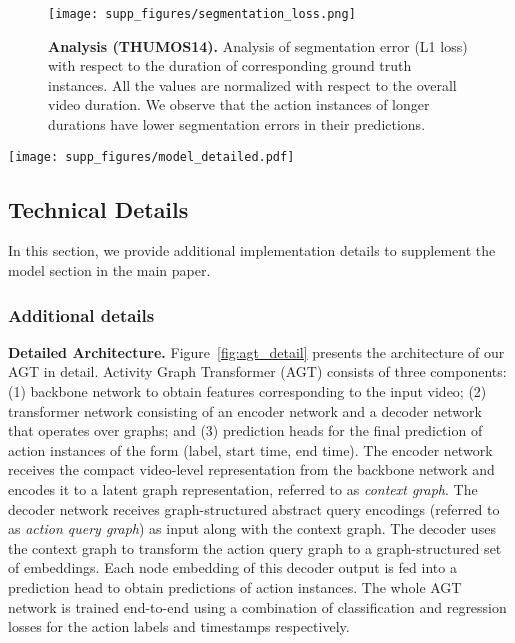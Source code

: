 \documentclass[10pt,twocolumn,letterpaper]{article}
\begin{document}
\begin{figure}
    \centering
    \texttt{[image: supp\_figures/segmentation\_loss.png]}
    \caption{\textbf{Analysis (THUMOS14). }Analysis of segmentation error (L1 loss) with respect to the duration of corresponding ground truth instances. All the values are normalized with respect to the overall video duration. We observe that the action instances of longer durations have lower segmentation errors in their predictions.}
    \label{fig:segmentation}
\end{figure}


\begin{figure*}
\centering
\texttt{[image: supp\_figures/model\_detailed.pdf]}
\caption{\textbf{Detailed Architecture} Architecture of Activity Graph Transformer. Please see Section~\ref{subsec:imp_arch} for details. `Q',`K',`V' are query, key and value to the self-attention layer as described in ~\cite{vaswani2017attention}.}
\label{fig:agt_detail}
\end{figure*}


\subsection{Technical Details}
In this section, we provide additional implementation details to supplement the model section in the main paper.

\subsubsection{Additional details}
\label{subsec:imp_arch}
\textbf{Detailed Architecture.} Figure~\ref{fig:agt_detail} presents the architecture of our AGT in detail. Activity Graph Transformer (AGT) consists of three components: (1) backbone network to obtain features corresponding to the input video; (2) transformer network consisting of an encoder network and a decoder network that operates over graphs; and (3) prediction heads for the final prediction of action instances of the form (label, start time, end time). The encoder network receives the compact video-level representation from the backbone network and encodes it to a latent graph representation, referred to as \textit{context graph}. The decoder network receives graph-structured abstract query encodings (referred to as \textit{action query graph}) as input along with the context graph. The decoder uses the context graph to transform the action query graph to a graph-structured set of embeddings. Each node embedding of this decoder output is fed into a prediction head to obtain predictions of action instances. The whole AGT network is trained end-to-end using a combination of classification and regression losses for the action labels and timestamps respectively. 
\end{document}
